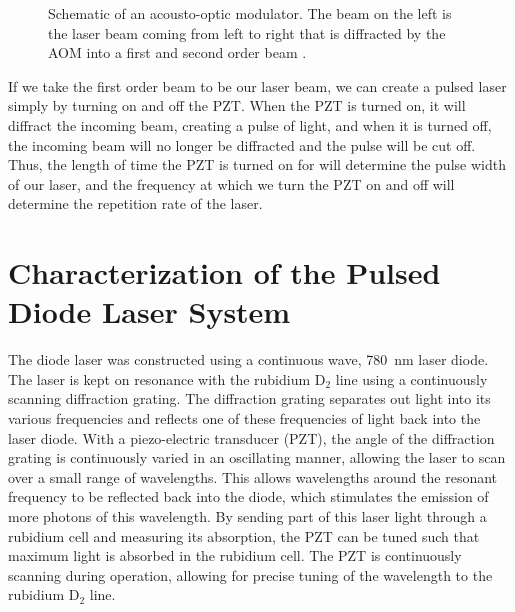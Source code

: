 
\begin{figure}[h]
		\centering
		
		\caption{Schematic of an acousto-optic modulator. The beam on the left is the laser beam coming from left to right that is diffracted by the AOM into a first and second order beam \protect\cite{aomfig}.}
		\label{fig:AOM1}
\end{figure}

If we take the first order beam to be our laser beam, we can create a pulsed laser simply by turning on and off the PZT. When the PZT is turned on, it will diffract the incoming beam, creating a pulse of light, and when it is turned off, the incoming beam will no longer be diffracted and the pulse will be cut off. Thus, the length of time the PZT is turned on for will determine the pulse width of our laser, and the frequency at which we turn the PZT on and off will determine the repetition rate of the laser.


\section{Characterization of the Pulsed Diode Laser System}

The diode laser was constructed using a continuous wave, \SI{780}{\nano \meter} laser diode. The laser is kept on resonance with the rubidium D$_2$ line using a continuously scanning diffraction grating. The diffraction grating separates out light into its various frequencies and reflects one of these frequencies of light back into the laser diode. With a piezo-electric transducer (PZT), the angle of the diffraction grating is continuously varied in an oscillating manner, allowing the laser to scan over a small range of wavelengths. This allows wavelengths around the resonant frequency to be reflected back into the diode, which stimulates the emission of more photons of this wavelength. By sending part of this laser light through a rubidium cell and measuring its absorption, the PZT can be tuned such that maximum light is absorbed in the rubidium cell. The PZT is continuously scanning during operation, allowing for precise tuning of the wavelength to the rubidium D$_2$ line.

